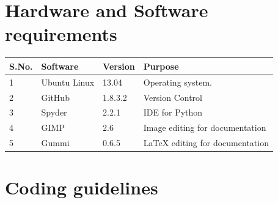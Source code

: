 \documentclass[11pt]{article}
\begin{document}
\section{Hardware and Software requirements}

\begin{center}
    \begin{tabular}{ | l | l | l | p{6cm} |}
    \hline
    \textbf{S.No.} & \textbf{Software} & \textbf{Version} & \textbf{Purpose}\\ \hline
    1 & Ubuntu Linux & 13.04 & Operating system. \\ \hline
    2 & GitHub & 1.8.3.2 &Version Control \\ \hline
    3 & Spyder & 2.2.1 & IDE for Python \\ \hline
    4 & GIMP & 2.6 & Image editing for documentation \\ \hline
    5 & Gummi & 0.6.5 & LaTeX editing for documentation \\ \hline    

    \end{tabular}
\end{center}

\section {Coding guidelines}	
\end{document}
